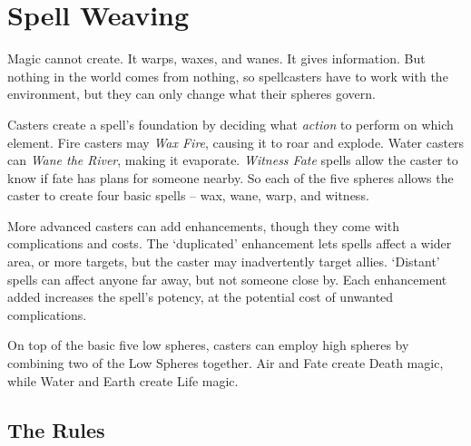 \chapter{Spell Weaving}

Magic cannot create.
It warps, waxes, and wanes.
It gives information.
But nothing in the world comes from nothing, so spellcasters have to work with the environment, but they can only change what their spheres govern.

Casters create a spell's foundation by deciding what \emph{action} to perform on which element.
Fire casters may \textit{Wax Fire}, causing it to roar and explode.
Water casters can \textit{Wane the River}, making it evaporate.
\textit{Witness Fate} spells allow the caster to know if fate has plans for someone nearby.
So each of the five spheres allows the caster to create four basic spells -- wax, wane, warp, and witness.

More advanced casters can add enhancements, though they come with complications and costs.
The `duplicated' enhancement lets spells affect a wider area, or more targets, but the caster may inadvertently target allies.
`Distant' spells can affect anyone far away, but not someone close by.
Each enhancement added increases the spell's potency, at the potential cost of unwanted complications.

On top of the basic five low spheres, casters can employ high spheres by combining two of the Low Spheres together.
Air and Fate create Death magic, while Water and Earth create Life magic.

\section{The Rules}

